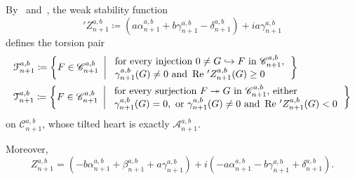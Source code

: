 \documentclass[11pt, reqno]{amsart}
\numberwithin{equation}{section}
\theoremstyle{plain}
\theoremstyle{remark}
\theoremstyle{definition}
\theoremstyle{italicsname}
\def\Re{\mathop{\rm Re}\nolimits}
\newcommand{\cF}{\mathcal{F}}
\newcommand{\cT}{\mathcal{T}}
\newcommand{\cA}{\mathscr{A}}
\newcommand{\cC}{\mathscr{C}}
\begin{document}
By~\cite[Proposition 4.6]{Liu:StabProd} and~\cite[Section 4.1]{curves}, the weak stability function 
\begin{equation*}
'Z_{n+1}^{a,b}\coloneqq \left(a\alpha^{a,b}_{n+1}+b\gamma^{a,b}_{n+1}-\delta^{a,b}_{n+1}\right)+ia\gamma^{a,b}_{n+1}
\end{equation*}
defines the torsion pair 
\begin{align*}
&\cF_{n+1}^{a,b}\coloneqq\left\{F\in\cC^{a,b}_{n+1}~\left|~\begin{array}{l}\text{for every injection }0\neq G\hookrightarrow F\text{ in }\cC^{a,b}_{n+1},\\ \gamma^{a,b}_{n+1}(G)\neq 0\text{ and }\Re\, {'Z_{n+1}^{a,b}(G)}\geq0\end{array}\right. \right\} \\
&\cT_{n+1}^{a,b}\coloneqq\left\{F\in\cC^{a,b}_{n+1}~\left|~\begin{array}{l}\text{for every surjection }F\twoheadrightarrow G \text{ in }\cC^{a,b}_{n+1},\,\text{either}\\ \gamma^{a,b}_{n+1}(G)=0, \text{ or } \gamma^{a,b}_{n+1}(G)\neq 0\text{ and }\Re\, {'Z_{n+1}^{a,b}(G)}<0\end{array}\right. \right\} 
\end{align*}
on $\cC^{a,b}_{n+1}$, whose tilted heart is exactly $\cA_{n+1}^{a,b}$. 


Moreover,
\begin{equation}\label{eq:PositivityZParis3}
Z^{a,b}_{n+1}=\left(-b\alpha^{a,b}_{n+1}+\beta^{a,b}_{n+1}+a\gamma^{a,b}_{n+1}\right)+i\left(-a\alpha^{a,b}_{n+1}-b\gamma^{a,b}_{n+1}+\delta^{a,b}_{n+1}\right).    
\end{equation}
\end{document}

